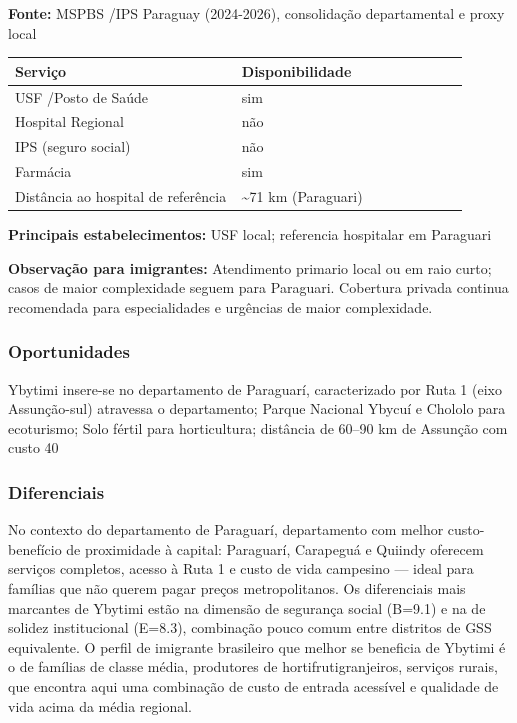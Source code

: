 \textbf{Fonte:} MSPBS /\allowbreak  IPS Paraguay (2024-2026), consolidação
departamental e proxy local

{\def\LTcaptype{none} %
\begin{longtable}{@{}>{\raggedright\arraybackslash}p{0.45\linewidth} >{\raggedright\arraybackslash}p{0.45\linewidth}@{}}
\toprule\noalign{}
Serviço & Disponibilidade \\
\midrule\noalign{}
\endhead
\bottomrule\noalign{}
\endlastfoot
USF /\allowbreak  Posto de Saúde & sim \\
Hospital Regional & não \\
IPS (seguro social) & não \\
Farmácia & sim \\
Distância ao hospital de referência & \textasciitilde71 km
(Paraguari) \\
\end{longtable}
}

\textbf{Principais estabelecimentos:} USF local; referencia hospitalar
em Paraguari

\textbf{Observação para imigrantes:} Atendimento primario local ou em
raio curto; casos de maior complexidade seguem para Paraguari. Cobertura
privada continua recomendada para especialidades e urgências de maior
complexidade.

\subsubsection*{Oportunidades}\label{oport-ybytimi-0918}
Ybytimi insere-se no departamento de Paraguarí, caracterizado por Ruta 1 (eixo Assunção-sul) atravessa o departamento; Parque Nacional Ybycuí e Chololo para ecoturismo; Solo fértil para horticultura; distância de 60–90 km de Assunção com custo 40%

\subsubsection*{Diferenciais}\label{dif-ybytimi-0918}
No contexto do departamento de Paraguarí, departamento com melhor custo-benefício de proximidade à capital: Paraguarí, Carapeguá e Quiindy oferecem serviços completos, acesso à Ruta 1 e custo de vida campesino — ideal para famílias que não querem pagar preços metropolitanos. Os diferenciais mais marcantes de Ybytimi estão na dimensão de segurança social (B=9.1) e na de solidez institucional (E=8.3), combinação pouco comum entre distritos de GSS equivalente. O perfil de imigrante brasileiro que melhor se beneficia de Ybytimi é o de famílias de classe média, produtores de hortifrutigranjeiros, serviços rurais, que encontra aqui uma combinação de custo de entrada acessível e qualidade de vida acima da média regional.

